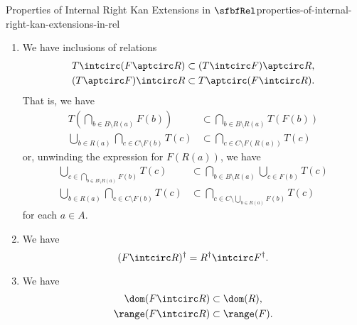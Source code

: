 \begin{proposition}{Properties of Internal Right Kan Extensions in $\sfbfRel$}{properties-of-internal-right-kan-extensions-in-rel}
\begin{enumerate}
\begin{align*}
                R\intcirc\Delta_{A}  &= R.
            \end{align*}
            That is, we have
            \begin{align*}
                \bigcup_{b\in R(a)}\{b\} &= R(a),\\
                \bigcup_{a\in\{a\}}R(a)  &= R(a)
            \end{align*}
            for each $a\in A$.
        \item\label{properties-of-internal-right-kan-extensions-in-rel-linear-distributivity}We have inclusions of relations
            \begin{align*}
                T\intcirc(F\aptcirc R)  &\subset (T\intcirc F)\aptcirc R,\\
                (T\aptcirc F)\intcirc R &\subset T\aptcirc(F\intcirc R).
            \end{align*}
            That is, we have
            \begin{align*}
                T(\bigcap_{b\in B\setminus R(a)}F(b))  &\subset \bigcap_{b\in B\setminus R(a)}T(F(b))\\
                \bigcup_{b\in R(a)}\bigcap_{c\in C\setminus F(b)}T(c) &\subset \bigcap_{c\in C\setminus F(R(a))}T(c)
            \end{align*}
            or, unwinding the expression for $F(R(a))$, we have
            \begin{align*}
                \bigcup_{c\in\bigcap_{b\in B\setminus R(a)}F(b)}T(c)  &\subset \bigcap_{b\in B\setminus R(a)}\bigcup_{c\in F(b)}T(c)\\
                \bigcup_{b\in R(a)}\bigcap_{c\in C\setminus F(b)}T(c) &\subset \bigcap_{c\in C\setminus\bigcup_{b\in R(a)}F(b)}T(c)
            \end{align*}
            for each $a\in A$.
        \item\label{properties-of-internal-right-kan-extensions-in-rel-interaction-with-converses}We have
            \[
                (F\intcirc R)^{\dagger}
                =
                R^{\dagger}\intcirc F^{\dagger}.
            \]%
        \item\label{properties-of-internal-right-kan-extensions-in-rel-interaction-with-ranges-and-domains}We have
            \begin{align*}
                \dom(F\intcirc R)   &\subset \dom(R),\\
                \range(F\intcirc R) &\subset \range(F).
            \end{align*}
    \end{enumerate}
\end{proposition}
